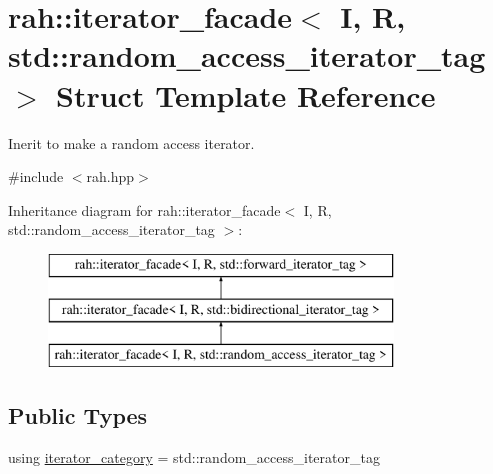 \hypertarget{structrah_1_1iterator__facade_3_01_i_00_01_r_00_01std_1_1random__access__iterator__tag_01_4}{}\section{rah\+::iterator\+\_\+facade$<$ I, R, std\+::random\+\_\+access\+\_\+iterator\+\_\+tag $>$ Struct Template Reference}
\label{structrah_1_1iterator__facade_3_01_i_00_01_r_00_01std_1_1random__access__iterator__tag_01_4}


Inerit to make a random access iterator.  




{\ttfamily \#include $<$rah.\+hpp$>$}

Inheritance diagram for rah\+::iterator\+\_\+facade$<$ I, R, std\+::random\+\_\+access\+\_\+iterator\+\_\+tag $>$\+:\begin{figure}[H]
\begin{center}
\leavevmode
\includegraphics[height=3.000000cm]{structrah_1_1iterator__facade_3_01_i_00_01_r_00_01std_1_1random__access__iterator__tag_01_4}
\end{center}
\end{figure}
\subsection*{Public Types}
\begin{DoxyCompactItemize}
\item 
using \mbox{\hyperlink{structrah_1_1iterator__facade_3_01_i_00_01_r_00_01std_1_1random__access__iterator__tag_01_4_a90e8ca56b8c64c3342bcfbc722931cc5}{iterator\+\_\+category}} = std\+::random\+\_\+access\+\_\+iterator\+\_\+tag
\end{DoxyCompactItemize}
